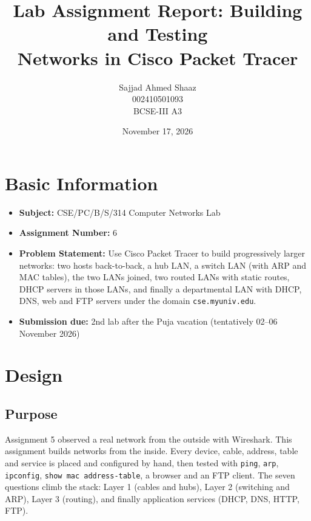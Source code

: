 \documentclass[11pt]{article}
\title{\Large\textbf{Lab Assignment Report: Building and Testing\\ Networks in Cisco Packet Tracer}}
\author{Sajjad Ahmed Shaaz \\ 002410501093 \\ BCSE-III A3}
\date{November 17, 2026}
\begin{document}
\maketitle

\section*{Basic Information}
\begin{itemize}[leftmargin=1.6em]
  \item \textbf{Subject:} CSE/PC/B/S/314 Computer Networks Lab
  \item \textbf{Assignment Number:} 6
  \item \textbf{Problem Statement:} Use Cisco Packet Tracer to build progressively larger
  networks: two hosts back-to-back, a hub LAN, a switch LAN (with ARP and MAC tables), the
  two LANs joined, two routed LANs with static routes, DHCP servers in those LANs, and finally
  a departmental LAN with DHCP, DNS, web and FTP servers under the domain
  \texttt{cse.myuniv.edu}.
  \item \textbf{Submission due:} 2nd lab after the Puja vacation (tentatively 02--06
  November 2026)
\end{itemize}

\section{Design}

\subsection{Purpose}
Assignment 5 observed a real network from the outside with Wireshark. This assignment
builds networks from the inside. Every device, cable, address, table and service is placed
and configured by hand, then tested with \texttt{ping}, \texttt{arp}, \texttt{ipconfig},
\texttt{show mac address-table}, a browser and an FTP client. The seven questions climb
the stack: Layer 1 (cables and hubs), Layer 2 (switching and ARP), Layer 3 (routing), and
finally application services (DHCP, DNS, HTTP, FTP).
\end{document}
